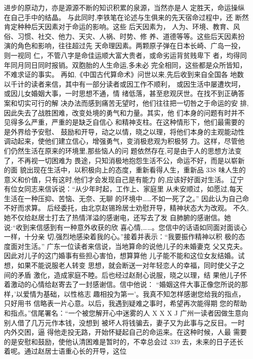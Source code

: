 进步的原动力，亦是源源不断的知识积累的泉源，当然亦是人
定胜天，命运操纵在自己手中的结晶。
与此同时,李铁笔在论述与生俱来的先天宿命过程中，还
断然肯定种种后天因素对于命运的影响。这些 后天因素为，
人为、环境、教育、风俗、习惯、社交、他力、天灾、人祸、时势、修
养、道德等等。这些后天因素扮演的角色和影响，往往超过先
天命理因素。两颗原子弹在日本长崎、广岛一投，则一视同
仁，不管八字是命佳运顺大富大贵者，或命劣运背贫贱卑下
者，均得同年同月同日同时报销。双胞胎的人生命运,多未必
完全相同，这些都是众所皆知，不难求证的事实。
再如,《中国古代算命术》问世以来,先后收到来自全国各
地数以千计的读者来信，其中有一部分读者或因工作不顺利，
或因生活中屡遭坎坷，或因儿女婚姻大事，一时思想不通，情
绪低落，甚至悲观厌世。在找不到正确答案和切实可行的解
决办法而感到痛苦无望时，他们往往把一切咎之于命运的安
排,因此失去了战胜困难，改变处境的勇气和力量。其实，他
们本身的问题有时并不见得多么严重，严重的是缺乏自信心
和精神支柱。在这种情形下，他们最需要的是外界给予安慰、
鼓励和开导，动之以情，晓之以理，将他们本身的主观能动性
调动起来，使他们建立信心，增强勇气，变消极悲观为积极努
力。这样，尽管他们仍然生活在原来的环境里,那些恼人的问
题依然存在,可是由于人的思想方法变了，不再视一切困难为
畏途，只知消极地抱怨生活不公，命运不好，而是以崭新的面
貌出现在生活中，以积极向上的态度，重新看得人生，重新品
 338 
味人生的意义和价值，只有这时,他们才会发现自己是有能力
的,应该好好面对生活。
辽宁有位女同志来信诉说：“从少年时起，工作上、家庭里
从未安顺过，如愿过,每天生活在一种压抑、苦恼、无奈、无聊
的环境中……不如一死了之。” 因此认为自己命不好而求算。
后经委托，由北京赵锡玲居士劝慰开导，精神状态大为改观。
不久,她不仅给赵居士打去了热情洋溢的感谢电，还写去了发
自肺腑的感谢信。她说:“收到来信感到有一种意外收获的欣
喜心情,……。您信中的话语如同面对面谈心一样，十分亲
切,强烈地感染着我的心。”接着并表示：“我要振作精神以积
极的态度面对生活。”
广东一位读者来信说，当地算命的说他儿子的未婚妻克
父又克夫。因此对儿子的这门婚事有些担心害怕，想算算他
儿子能不能和这位女友结婚。试想，如果不能说服老人转变
思想，就会断送一对年轻恋人的幸福，同时使父子之间的矛盾
激化，造成家庭不睦。后也经过赵耐心说服，晓之以理，结
果他儿子怀着激动的心情给赵寄去了一封感谢信。信中他说：
“婚姻这件大事正像您所说的那样，'以爱情为基础，以性格志
趣相投为第一'。我真不知怎样感谢您给我的指点，只好用书
信略表一片心意。以后，我遇到疑难之事时，希望再次能得期
您的帮助和指点。”信尾署名：“一个被您解开心中迷雾的人 X
X X J
广州一读者因做生意向别人借了几万元作本钱，没想到
被坏人将钱骗去，妻子又为此事与之反目。一时内外交困，逼
得他走投无路，开始怀疑起自己的命运来。在这种时候，人最
需要的是安慰和鼓励，使他认清困难是暂时的，不幸总会过
 339 
去，未来的日子还长着呢。通过赵居士语重心长的开导，这位
